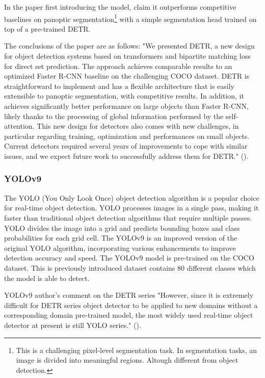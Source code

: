 In the paper first introducing the model, \citeauthor{carion2020endtoend} claim it outperforms competitive baselines on panoptic segmentation\footnote{This is a challenging pixel-level segmentation task. In segmentation tasks, an image is divided into meaningful regions. Altough different from object detection.} with a simple segmentation head trained on top of a pre-trained DETR. 

The conclusions of the paper are as follows: "We presented DETR, a new design for object detection systems based on transformers and bipartite matching loss for direct set prediction. The approach achieves comparable results to an optimized Faster R-CNN baseline on the challenging COCO dataset. DETR is straightforward to implement and has a flexible architecture that is easily extensible to panoptic segmentation, with competitive results. In addition, it achieves significantly better performance on large objects than Faster R-CNN, likely thanks to the processing of global information performed by the self-attention. This new design for detectors also comes with new challenges, in particular regarding training,  optimization and performances on small objects. Current detectors required several years of improvements to cope with similar issues, and we expect future work to successfully address them for DETR." (\cite{carion2020endtoend}).

\subsubsection{YOLOv9}
\label{sec:yolov9}
The YOLO (You Only Look Once) object detection algorithm is a popular choice for real-time object detection. YOLO processes images in a single pass, making it faster than traditional object detection algorithms that require multiple passes. YOLO divides the image into a grid and predicts bounding boxes and class probabilities for each grid cell. The YOLOv9 is an improved version of the original YOLO algorithm, incorporating various enhancements to improve detection accuracy and speed. The YOLOv9 model is pre-trained on the COCO dataset. This is previously introduced dataset contains 80 different classes which the model is able to detect. 

\begin{myquote}{YOLOv9 author's comment on the DETR series}
    "However, since it is extremely difficult for DETR series object detector to be applied to new domains without a corresponding domain pre-trained model, the most widely used real-time object detector at present is still YOLO series." (\cite{wa2024yolov9}).
\end{myquote}


